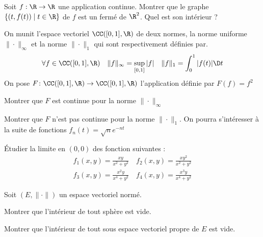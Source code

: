 \documentclass{report}
\begin{document}
\begin{exo}
    Soit \(f:\R\to\R\) une application continue. Montrer que le graphe
    \(\{(t,f(t))\mid t\in\R\}\) de \(f\) est un fermé de \(\R^2\). Quel
    est son intérieur ?
\end{exo}

\begin{exo}
    On munit l'espace vectoriel \(\CC([0,1], \R)\) de deux normes, la
    norme uniforme \(\|\cdot\|_\infty\) et la norme \(\|\cdot\|_1\) qui
    sont respectivement définies par.
    \[\forall f\in\CC([0,1],\R) \quad
    \|f\|_\infty = \sup_{[0,1]}|f| \quad
    \|f\|_1 = \int_0^1|f(t)|\D t\]
    On pose \(F\colon\CC([0,1],\R)\to\CC([0,1],\R)\) l'application définie
    par \(F(f) = f^2\)
    \begin{q}{1}
        Montrer que \(F\) est continue pour la norme \(\|\cdot\|_\infty\)
    \end{q}
    \begin{q}{2}
        Montrer que \(F\) n'est pas continue pour la norme \(\|\cdot\|_1\). On
        pourra s'intéresser à la suite de fonctions \(f_n(t) = \sqrt{n}e^{-nt}\)  
    \end{q}
\end{exo}

\begin{exo}
    Étudier la limite en \((0,0)\) des fonction suivantes :
    \begin{align*}
        f_1(x,y)=\frac{xy}{x^2+y^2} \quad
        f_2(x,y)=\frac{xy^2}{x^2+y^2} \\
        f_3(x,y)=\frac{x^2y}{x^4+y^2} \quad
        f_4(x,y)=\frac{x^3y}{x^4+y^2}
    \end{align*}
\end{exo}

\begin{exo}
    Soit \(\left(E,\|\cdot\|\right)\) un espace vectoriel normé.
    \begin{q}{1}
        Montrer que l'intérieur de tout sphère est vide.
    \end{q}
    \begin{q}{2}
        Montrer que l'intérieur de tout sous espace vectoriel
        propre de \(E\) est vide.
    \end{q}
\end{exo}
\end{document}
